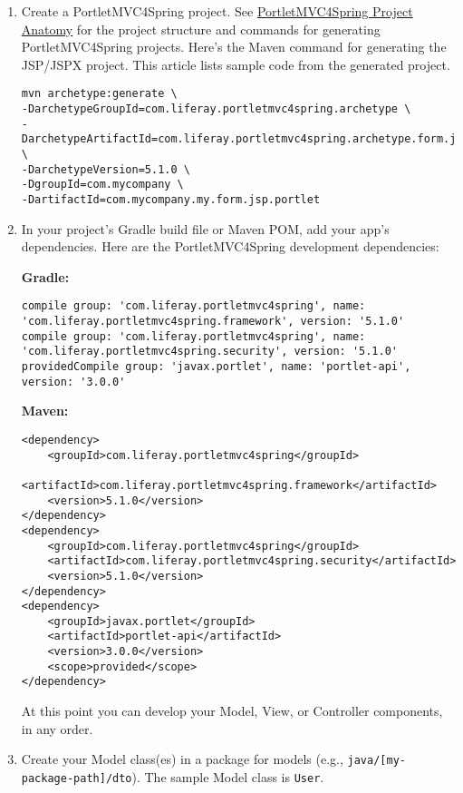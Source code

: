 \begin{enumerate}
\def\labelenumi{\arabic{enumi}.}
\item
  Create a PortletMVC4Spring project. See
  \href{/docs/7-2/reference/-/knowledge_base/r/portletmvc4spring-project-anatomy}{PortletMVC4Spring
  Project Anatomy} for the project structure and commands for generating
  PortletMVC4Spring projects. Here's the Maven command for generating
  the JSP/JSPX project. This article lists sample code from the
  generated project.

\begin{verbatim}
mvn archetype:generate \
-DarchetypeGroupId=com.liferay.portletmvc4spring.archetype \
-DarchetypeArtifactId=com.liferay.portletmvc4spring.archetype.form.jsp.portlet \
-DarchetypeVersion=5.1.0 \ 
-DgroupId=com.mycompany \ 
-DartifactId=com.mycompany.my.form.jsp.portlet
\end{verbatim}
\item
  In your project's Gradle build file or Maven POM, add your app's
  dependencies. Here are the PortletMVC4Spring development dependencies:

  \textbf{Gradle:}

\begin{verbatim}
compile group: 'com.liferay.portletmvc4spring', name: 'com.liferay.portletmvc4spring.framework', version: '5.1.0'
compile group: 'com.liferay.portletmvc4spring', name: 'com.liferay.portletmvc4spring.security', version: '5.1.0'
providedCompile group: 'javax.portlet', name: 'portlet-api', version: '3.0.0'
\end{verbatim}

  \textbf{Maven:}

\begin{verbatim}
<dependency>
    <groupId>com.liferay.portletmvc4spring</groupId>
    <artifactId>com.liferay.portletmvc4spring.framework</artifactId>
    <version>5.1.0</version>
</dependency>
<dependency>
    <groupId>com.liferay.portletmvc4spring</groupId>
    <artifactId>com.liferay.portletmvc4spring.security</artifactId>
    <version>5.1.0</version>
</dependency>
<dependency>
    <groupId>javax.portlet</groupId>
    <artifactId>portlet-api</artifactId>
    <version>3.0.0</version>
    <scope>provided</scope>
</dependency>
\end{verbatim}

  At this point you can develop your Model, View, or Controller
  components, in any order.
\item
  Create your Model class(es) in a package for models (e.g.,
  \texttt{java/{[}my-package-path{]}/dto}). The sample Model class is
  \texttt{User}.


\end{enumerate}
